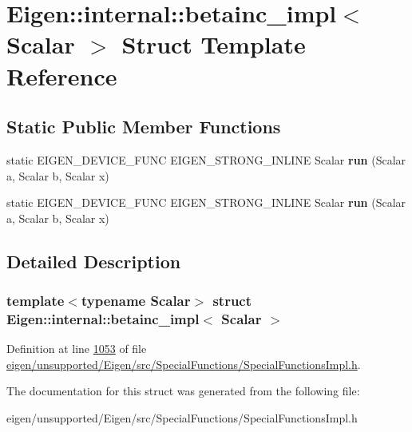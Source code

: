\hypertarget{struct_eigen_1_1internal_1_1betainc__impl}{}\section{Eigen\+:\+:internal\+:\+:betainc\+\_\+impl$<$ Scalar $>$ Struct Template Reference}
\label{struct_eigen_1_1internal_1_1betainc__impl}
\subsection*{Static Public Member Functions}
\begin{DoxyCompactItemize}
\item 
\mbox{\label{struct_eigen_1_1internal_1_1betainc__impl_ab870f2c64c2307b5aa7877a01c95f1ac}} 
static E\+I\+G\+E\+N\+\_\+\+D\+E\+V\+I\+C\+E\+\_\+\+F\+U\+NC E\+I\+G\+E\+N\+\_\+\+S\+T\+R\+O\+N\+G\+\_\+\+I\+N\+L\+I\+NE Scalar {\bfseries run} (Scalar a, Scalar b, Scalar x)
\item 
\mbox{\label{struct_eigen_1_1internal_1_1betainc__impl_ab870f2c64c2307b5aa7877a01c95f1ac}} 
static E\+I\+G\+E\+N\+\_\+\+D\+E\+V\+I\+C\+E\+\_\+\+F\+U\+NC E\+I\+G\+E\+N\+\_\+\+S\+T\+R\+O\+N\+G\+\_\+\+I\+N\+L\+I\+NE Scalar {\bfseries run} (Scalar a, Scalar b, Scalar x)
\end{DoxyCompactItemize}


\subsection{Detailed Description}
\subsubsection*{template$<$typename Scalar$>$\newline
struct Eigen\+::internal\+::betainc\+\_\+impl$<$ Scalar $>$}



Definition at line \hyperlink{eigen_2unsupported_2_eigen_2src_2_special_functions_2_special_functions_impl_8h_source_l01053}{1053} of file \hyperlink{eigen_2unsupported_2_eigen_2src_2_special_functions_2_special_functions_impl_8h_source}{eigen/unsupported/\+Eigen/src/\+Special\+Functions/\+Special\+Functions\+Impl.\+h}.



The documentation for this struct was generated from the following file\+:\begin{DoxyCompactItemize}
\item 
eigen/unsupported/\+Eigen/src/\+Special\+Functions/\+Special\+Functions\+Impl.\+h\end{DoxyCompactItemize}
